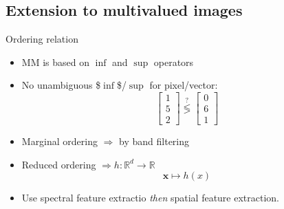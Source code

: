 \documentclass[10pt,aspectratio=1610]{beamer}
\begin{document}
\subsection{Extension to multivalued images}
\label{sec:org1b2ae1b}
\begin{frame}[label={sec:orgb5b1257}]{Ordering relation}
\begin{itemize}
\item MM is based on \(\inf\) and \(\sup\) operators
\item No unambiguous \$\(\inf\)\$/\(\sup\) for pixel/vector:
$$\begin{bmatrix}1\\5\\2\end{bmatrix} \overset{?}{\lessgtr} \begin{bmatrix}0\\6\\1\end{bmatrix}$$
\item Marginal ordering \(\Rightarrow\) by band filtering
\item Reduced ordering \(\Rightarrow h:\mathbb{R}^d\to\mathbb{R}\)
$$\mathbf{x}\mapsto h(x)$$
\item Use spectral feature extractio \emph{then} spatial feature extraction.
\end{itemize}
\end{frame}
\end{document}
